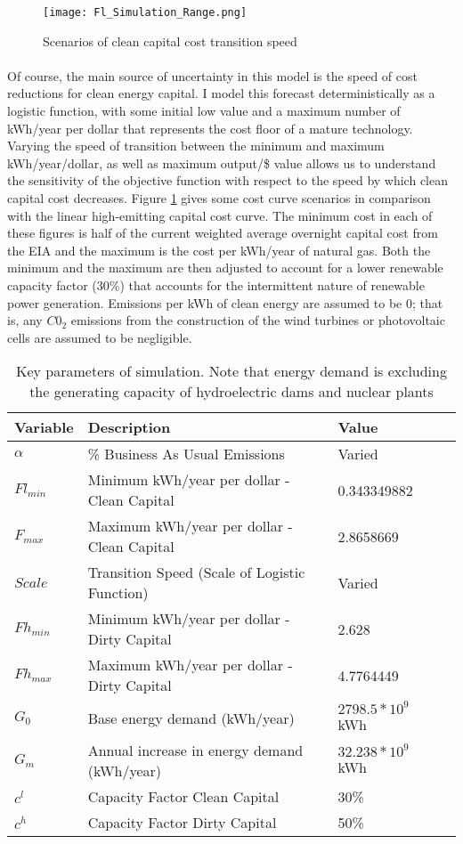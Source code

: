 \documentclass{article}
\begin{document}
\begin{figure}[h]
\texttt{[image: Fl\_Simulation\_Range.png]}
\caption{Scenarios of clean capital cost transition speed \label{fig:FlScaleScenarios}}
\end{figure}

\paragraph{} Of course, the main source of uncertainty in this model is the speed of cost reductions for clean energy capital. I model this forecast deterministically as a logistic function, with some initial low value and a maximum number of kWh/year per dollar that represents the cost floor of a mature technology. Varying the speed of transition between the minimum and maximum kWh/year/dollar, as well as maximum output/\$ value allows us to understand the sensitivity of the objective function with respect to the speed by which clean capital cost decreases. Figure \ref{fig:FlScaleScenarios} gives some cost curve scenarios in comparison with the linear high-emitting capital cost curve. The minimum cost in each of these figures is half of the current weighted average overnight capital cost from the EIA and the maximum is the cost per kWh/year of natural gas. Both the minimum and the maximum are then adjusted to account for a lower renewable capacity factor (30\%) that accounts for the intermittent nature of renewable power generation. Emissions per kWh of clean energy are assumed to be 0; that is, any $C0_2$ emissions from the construction of the wind turbines or photovoltaic cells are assumed to be negligible. 

\FloatBarrier

\begin{table}[h]\label{tab:ParamValues}
\begin{tabulary}{1.0\textwidth}{LLLL}
Variable & Description & Value\\
\hline
$\alpha$ &  \% Business As Usual Emissions  &  Varied \\
$Fl_{min}$ & Minimum kWh/year per dollar - Clean Capital & 0.343349882\\
$F_{max}$ & Maximum kWh/year per dollar - Clean Capital & 2.8658669 \\
$Scale$ & Transition Speed  (Scale of Logistic Function) & Varied \\
$Fh_{min}$ & Minimum kWh/year per dollar - Dirty Capital & 2.628 \\
$Fh_{max}$ & Maximum kWh/year per dollar - Dirty Capital & 4.7764449 \\
$G_0$ & Base energy demand (kWh/year) & $2798.5 * 10^9$ kWh\\
$G_m$ & Annual increase in energy demand (kWh/year) & $32.238 * 10^9$ kWh \\
$c^l$ & Capacity Factor Clean Capital & 30\% \\
$c^h$ & Capacity Factor Dirty Capital & 50\% \\
\hline
\end{tabulary}
\caption{Key parameters of simulation. Note that energy demand is excluding the generating capacity of hydroelectric dams and nuclear plants}
\end{table}
\end{document}
